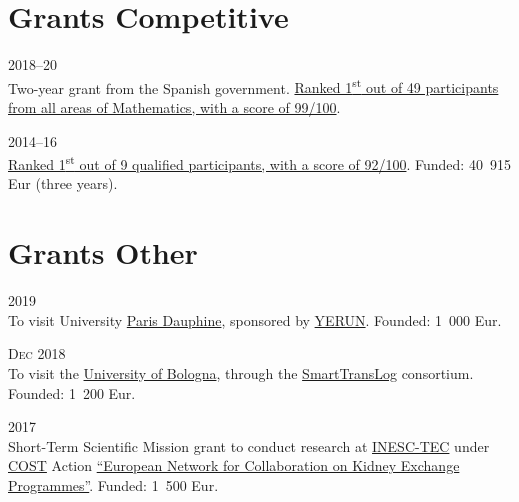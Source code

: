 \section*{Grants {\small Competitive}}

\begin{paracol}{2}
  \textsc{2018--20}
\switchcolumn
  \\
  Two-year grant from the Spanish government.
  \href{https://santini.in/files/cv/jdc17.pdf}{Ranked 1\textsuperscript{st} out of 49 participants from all areas of Mathematics, with a score of 99/100}.
\end{paracol}

\begin{paracol}{2}
  \textsc{2014--16}
\switchcolumn
  \\
  \href{https://santini.in/files/cv/phd14.pdf}{Ranked 1\textsuperscript{st} out of 9 qualified participants, with a score of 92/100}.
  Funded: 40~915 Eur (three years).
\end{paracol}

\section*{Grants {\small Other}}

\begin{paracol}{2}
  \textsc{2019}
\switchcolumn
  \\
  To visit University \href{https://www.dauphine.psl.eu/}{Paris Dauphine}, sponsored by \href{https://www.yerun.eu}{YERUN}.
  Founded: 1~000 Eur.
\end{paracol}

\begin{paracol}{2}
  \textsc{Dec 2018}
\switchcolumn
  \\
  To visit the \href{https://www.unibo.it/}{University of Bologna}, through the \href{https://smarttranslog.wordpress.com/}{SmartTransLog} consortium.
  Founded: 1~200 Eur.
\end{paracol}

\begin{paracol}{2}
  \textsc{2017}
\switchcolumn
  \\
  Short-Term Scientific Mission grant to conduct research at \href{https://www.inesctec.pt/}{INESC-TEC} under \href{http://www.cost.eu/}{COST} Action \href{http://www.enckep-cost.eu/}{``European Network for Collaboration on Kidney Exchange Programmes''}.
  Funded: 1~500 Eur.
\end{paracol}

